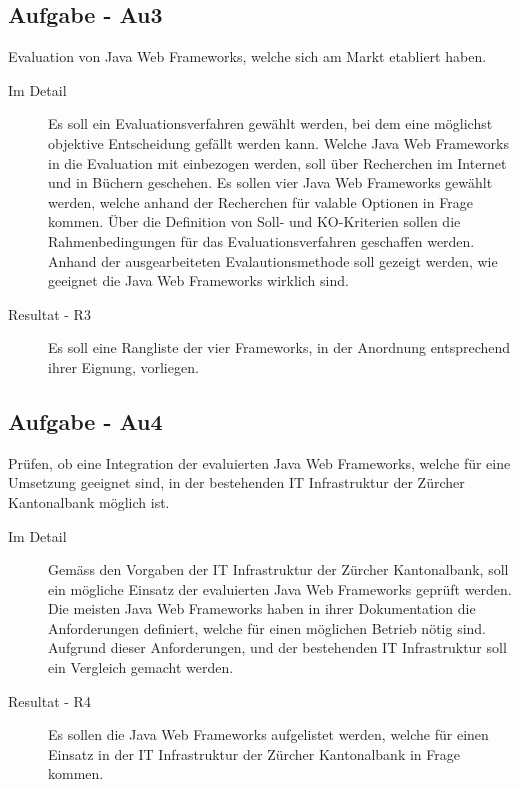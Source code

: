   \subsection{Aufgabe - Au3\label{itm:Aufgabe-03}}

  \begin{itshape}Evaluation von Java Web Frameworks, welche sich am Markt
  etabliert haben.\end{itshape}
  
  \begin{description}
    \item[Im Detail\label{itm:Detail-03}]
    Es soll ein Evaluationsverfahren gewählt werden, bei dem eine möglichst
    objektive Entscheidung gefällt werden kann. Welche Java Web Frameworks in
    die Evaluation mit einbezogen werden, soll über Recherchen im Internet und
    in Büchern geschehen. Es sollen vier Java Web Frameworks gewählt werden, welche
    anhand der Recherchen für valable Optionen in Frage kommen. Über die
    Definition von Soll- und KO-Kriterien sollen die Rahmenbedingungen für das
    Evaluationsverfahren geschaffen werden. Anhand der ausgearbeiteten
    Evalautionsmethode soll gezeigt werden, wie geeignet die Java Web Frameworks
    wirklich sind.
    \item[Resultat - R3\label{itm:Resultat-03}]
    Es soll eine Rangliste der vier Frameworks, in der Anordnung entsprechend
    ihrer Eignung, vorliegen.
  \end{description}
  
  \subsection{Aufgabe - Au4\label{itm:Aufgabe-04}}

  \begin{itshape}Prüfen, ob eine Integration der evaluierten Java Web
    Frameworks, welche für eine Umsetzung geeignet sind, in der bestehenden IT
    Infrastruktur der Zürcher Kantonalbank möglich ist.\end{itshape}
  
  \begin{description}
    \item[Im Detail\label{itm:Detail-04}]
    Gemäss den Vorgaben der IT Infrastruktur der Zürcher Kantonalbank, soll ein
    mögliche Einsatz der evaluierten Java Web Frameworks geprüft werden. Die
    meisten Java Web Frameworks haben in ihrer Dokumentation die Anforderungen
    definiert, welche für einen möglichen Betrieb nötig sind. Aufgrund dieser
    Anforderungen, und der bestehenden IT Infrastruktur soll ein Vergleich
    gemacht werden.
    \item[Resultat - R4\label{itm:Resultat-04}]
    Es sollen die Java Web Frameworks aufgelistet werden, welche für einen
    Einsatz in der IT Infrastruktur der Zürcher Kantonalbank in Frage kommen.
  \end{description}

